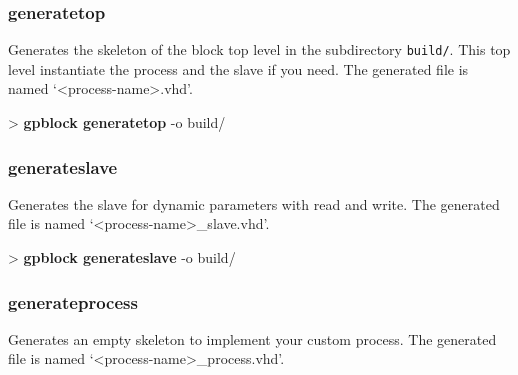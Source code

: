 \documentclass[10pt,a4paper]{article}
\begin{document}
\subsubsection{generatetop}

Generates the skeleton of the block top level in the subdirectory \texttt{build/}. This top level instantiate the process and the slave if you need. The generated file is named `<process-name>.vhd'.\\


\begin{sampletitle}
> \textbf{gpblock generatetop} -o build/
\end{sampletitle}

\subsubsection{generateslave}

Generates the slave for dynamic parameters with read and write. The generated file is named `<process-name>\_slave.vhd'.\\


\begin{sampletitle}
> \textbf{gpblock generateslave} -o build/
\end{sampletitle}

\subsubsection{generateprocess}

Generates an empty skeleton to implement your custom process. The generated file is named `<process-name>\_process.vhd'.\\

\end{document}
